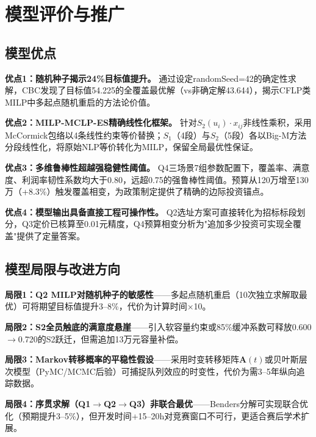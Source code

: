 
\section{模型评价与推广}

\subsection{模型优点}

\textbf{优点1：随机种子揭示24\%目标值提升。} 通过设定randomSeed=42的确定性求解，CBC发现了目标值54.225的全覆盖最优解（vs非确定解43.644），揭示CFLP类MILP中多起点随机重启的方法论价值。

\textbf{优点2：MILP-MCLP-ES精确线性化框架。} 针对$S_2(u_i)\cdot x_{ij}$非线性乘积，采用McCormick包络以4条线性约束等价替换；$S_1$（4段）与$S_2$（5段）各以Big-M方法分段线性化，将原始NLP等价转化为MILP，保留全局最优性保证。

\textbf{优点3：多维鲁棒性超越强稳健性阈值。} Q4三场景7组参数配置下，覆盖率、满意度、利润率韧性系数均大于0.80，远超0.75的强鲁棒性阈值。预算从120万增至130万（+8.3\%）触发覆盖相变，为政策制定提供了精确的边际投资锚点。

\textbf{优点4：模型输出具备直接工程可操作性。} Q2选址方案可直接转化为招标标段划分，Q3定价已核算至0.01元精度，Q4预算相变分析为"追加多少投资可实现全覆盖"提供了定量答案。

\subsection{模型局限与改进方向}

\textbf{局限1：Q2 MILP对随机种子的敏感性}——多起点随机重启（10次独立求解取最优）可将期望目标值提升3--8\%，代价为计算时间$\times$10。

\textbf{局限2：S2全员触底的满意度悬崖}——引入软容量约束或85\%缓冲系数可释放0.600$\to$0.720的S2跃迁，但需追加13万元容量补偿。

\textbf{局限3：Markov转移概率的平稳性假设}——采用时变转移矩阵$\mathbf{A}(t)$或贝叶斯层次模型（PyMC/MCMC后验）可捕捉队列效应的时变性，代价为需3--5年纵向追踪数据。

\textbf{局限4：序贯求解（Q1$\to$Q2$\to$Q3）非联合最优}——Benders分解可实现联合优化（预期提升3--5\%），但开发时间+15--20h对竞赛窗口不可行，更适合赛后学术扩展。

